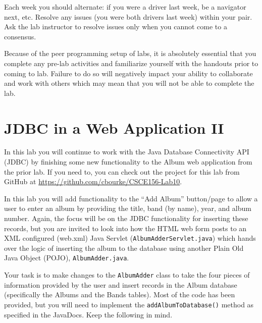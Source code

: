 \documentclass[12pt]{scrartcl}
\begin{document}
Each week you should alternate: if you were a driver last week, 
be a navigator next, etc.  Resolve any issues (you were both drivers
last week) within your pair.  Ask the lab instructor to resolve issues
only when you cannot come to a consensus.  

Because of the peer programming setup of labs, it is absolutely 
essential that you complete any pre-lab activities and familiarize
yourself with the handouts prior to coming to lab.  Failure to do
so will negatively impact your ability to collaborate and work with 
others which may mean that you will not be able to complete the
lab.  

\section*{JDBC in a Web Application II}

In this lab you will continue to work with the Java Database Connectivity 
API (JDBC)  by finishing some new functionality to the Album web application 
from the prior lab.  If you need to, you can check out the project for this
lab from GitHub at \url{https://github.com/cbourke/CSCE156-Lab10}.

In this lab you will add functionality to the ``Add Album'' button/page
to allow a user to enter an album by providing the title, band (by name), 
year, and album number.  Again, the focus will be on the JDBC functionality 
for inserting these records, but you are invited to look into how the HTML 
web form posts to an XML configured (web.xml) Java Servlet 
(\texttt{AlbumAdderServlet.java}) which hands over the logic 
of inserting the album to the database using another Plain Old Java 
Object (POJO), \texttt{AlbumAdder.java}.

Your task is to make changes to the \texttt{AlbumAdder} class 
to take the four pieces of information provided by the user and insert 
records in the Album database (specifically the Albums and the Bands 
tables).  Most of the code has been provided, but you will need to 
implement the \texttt{addAlbumToDatabase()} method as specified
in the JavaDocs.  Keep the following in mind.
\end{document}
